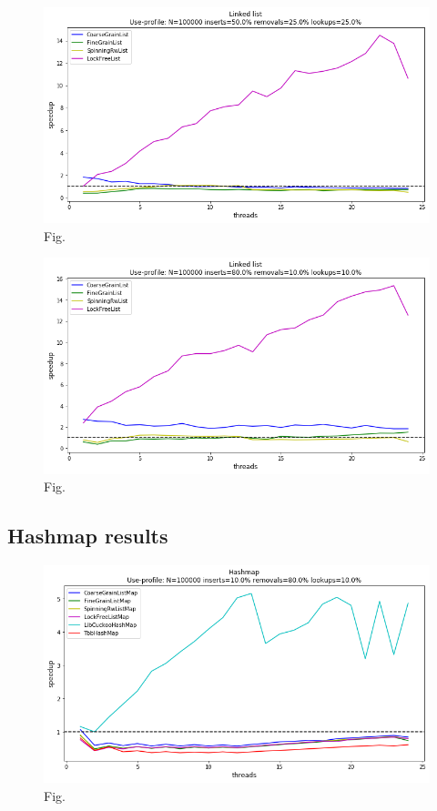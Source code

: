 \documentclass[11pt]{article}
\begin{document}
\begin{figure}[h]
\centering
\includegraphics[width=1.0\linewidth]{figs/lateday/combined/lateday_combined_list_insert_50_lookup_25_removal_25}
\caption{Fig.}
\label{fig:fig1}
\end{figure}

\begin{figure}[h]
\centering
\includegraphics[width=1.0\linewidth]{figs/lateday/combined/lateday_combined_list_insert_80_lookup_10_removal_10}
\caption{Fig.}
\label{fig:fig1}
\end{figure}

\subsection{Hashmap results}

\begin{figure}[h]
\centering
\includegraphics[width=0.5\linewidth]{figs/lateday/combined/lateday_combined_map_insert_10_lookup_10_removal_80}
\caption{Fig.}
\label{fig:fig2}
\end{figure}
\end{document}
